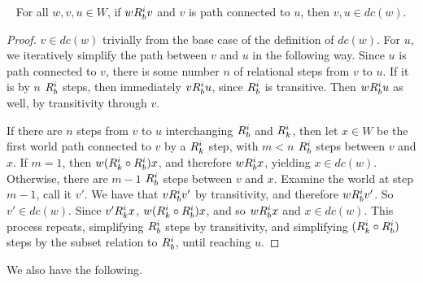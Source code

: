 \begin{theorem}~\label{dpc_theorem}
For all $w,v,u\in W$, if $wR_{b}^iv$ and $v$ is path connected to $u$, then $v,u\in dc(w)$.
\end{theorem}
\begin{proof}
	$v\in dc(w)$ trivially from the base case of the definition of $dc(w)$. For $u$, we iteratively simplify the path between $v$ and $u$ in the following way. Since $u$ is path connected to $v$, there is some number $n$ of relational steps from $v$ to $u$. If it is by $n$ $R_{b}^i$ steps, then immediately $vR_{b}^iu$, since $R_{b}^i$ is transitive. Then $wR_{b}^iu$ as well, by transitivity through $v$.
	
	If there are $n$ steps from $v$ to $u$ interchanging $R_{b}^i$ and $R_{k}^i$, then let $x\in W$ be the first world path connected to $v$ by a $R_{k}^i$ step, with $m<n$ $R_{b}^i$ steps between $v$ and $x$. If $m=1$, then $w(R_{k}^i \circ R_{b}^i)x$, and therefore $wR_{b}^ix$, yielding $x\in dc(w)$. Otherwise, there are $m-1$ $R_{b}^i$ steps between $v$ and $x$. Examine the world at step $m-1$, call it $v'$. We have that $vR_{b}^iv'$ by transitivity, and therefore $wR_{b}^iv'$. So $v'\in dc(w)$. Since $v'R_{k}^ix$, $w(R_{k}^i \circ R_{b}^i)x$, and so $wR_{b}^ix$ and $x \in dc(w)$. This process repeats, simplifying $R_{b}^i$ steps by transitivity, and simplifying $(R_{k}^i \circ R_{b}^i)$ steps by the subset relation to $R_{b}^i$, until reaching $u$. 
\end{proof}

We also have the following.

